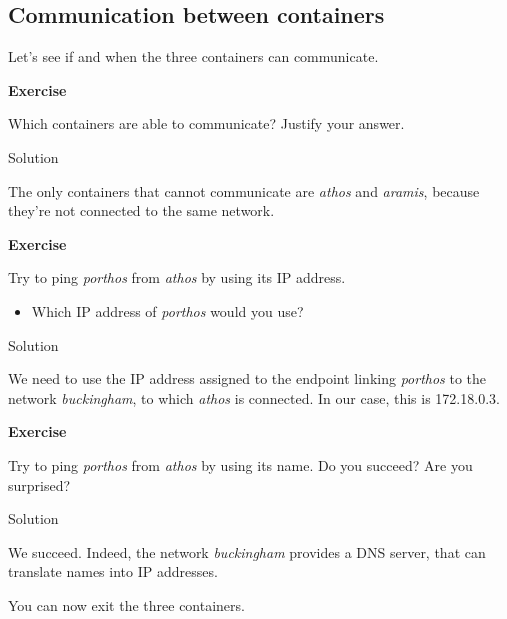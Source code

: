 \documentclass[
]{article}
\providecommand{\tightlist}{%
  \setlength{\itemsep}{0pt}\setlength{\parskip}{0pt}}
\newenvironment{infobox}[1]
  {
  \begin{itemize}
  \renewcommand{\labelitemi}{
    \raisebox{-.7\height}[0pt][0pt]{
      
    }
  }
  \setlength{\fboxsep}{1em}
  \begin{whitebox}
  \item
  }
  {
  \end{whitebox}
  \end{itemize}
  }
\theoremstyle{definition}
\theoremstyle{definition}
\theoremstyle{definition}
\theoremstyle{remark}
\let\BeginKnitrBlock\begin \let\EndKnitrBlock\end
\begin{document}
\subsection{Communication between containers}\label{communication-between-containers}

Let's see if and when the three containers can communicate.

\begin{infobox}{exercisebox}

\textbf{Exercise}

\BeginKnitrBlock{exercise}
\label{exr:unnamed-chunk-34}{\label{exr:unnamed-chunk-34} }Which containers are able to communicate?
Justify your answer.
\EndKnitrBlock{exercise}

\end{infobox}

Solution

\begin{infobox}{exercisebox}
The only containers that cannot communicate are \emph{athos} and \emph{aramis},
because they're not connected to the same network.

\end{infobox}

\begin{infobox}{exercisebox}

\textbf{Exercise}

\BeginKnitrBlock{exercise}
\label{exr:unnamed-chunk-35}{\label{exr:unnamed-chunk-35} }Try to ping \emph{porthos} from \emph{athos} by using its IP address.

\begin{itemize}
\tightlist
\item
  Which IP address of \emph{porthos} would you use?
\end{itemize}
\EndKnitrBlock{exercise}

\end{infobox}

Solution

\begin{infobox}{exercisebox}
We need to use the IP address assigned to the endpoint linking
\emph{porthos} to the network \emph{buckingham}, to which \emph{athos} is connected.
In our case, this is 172.18.0.3.

\end{infobox}

\begin{infobox}{exercisebox}

\textbf{Exercise}

\BeginKnitrBlock{exercise}
\label{exr:unnamed-chunk-36}{\label{exr:unnamed-chunk-36} }Try to ping \emph{porthos} from \emph{athos} by using its name.
Do you succeed? Are you surprised?
\EndKnitrBlock{exercise}

\end{infobox}

Solution

\begin{infobox}{exercisebox}
We succeed. Indeed, the network \emph{buckingham} provides a DNS server, that
can translate names into IP addresses.

\end{infobox}

You can now exit the three containers.
\end{document}
